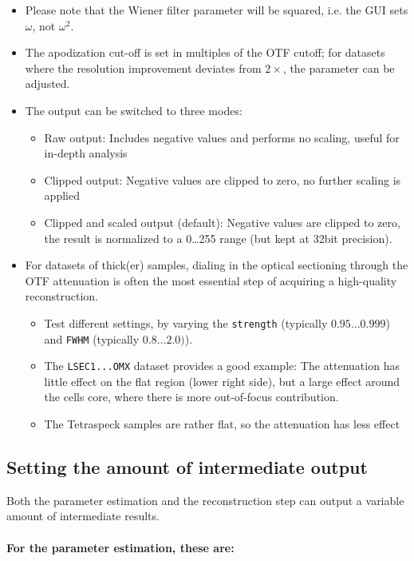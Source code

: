 \documentclass[twoside=false,
           twocolumn=false,
           a4paper,DIV=15,
           10pt]{scrartcl}
\begin{document}
\begin{itemize}
\item Please note that the Wiener filter
parameter will be squared, i.e. the GUI sets $\omega$, 
not $\omega^2$. 
\item The apodization cut-off is set in
multiples of the OTF cutoff; for datasets where
the resolution improvement deviates from $2\times$,
the parameter can be adjusted.
\item The output can be switched to three modes:
\begin{itemize}
\item Raw output: Includes negative values and performs
no scaling, useful for in-depth analysis
\item Clipped output: Negative values are clipped to zero,
no further scaling is applied
\item Clipped and scaled output (default): Negative values
are clipped to zero, the result is normalized to a 0\dots255
range (but kept at 32bit precision).
\end{itemize}
\item For datasets of thick(er) samples, dialing in the optical
sectioning through the OTF attenuation is often 
the most essential step of acquiring a high-quality reconstruction. 
\begin{itemize}
\item Test different
settings, by varying the \verb+strength+ 
(typically $0.95\dots0.999$) 
and \verb+FWHM+ (typically $0.8\dots2.0)$).
\item The \verb+LSEC1...OMX+ dataset provides
a good example: The attenuation has little effect
on the flat region (lower right side), but a large
effect around the cells core, where there is more
out-of-focus contribution.
\item The Tetraspeck samples are rather flat,
so the attenuation has less effect
\end{itemize}
\end{itemize}

\subsection{Setting the amount of intermediate output}

Both the parameter estimation and the reconstruction step can output
a variable amount of intermediate results. 
\paragraph{For the parameter estimation,
these are:}
\end{document}

